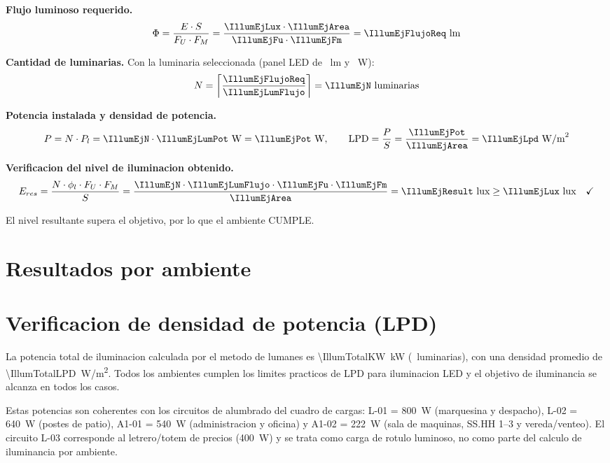 \textbf{Flujo luminoso requerido.}
\[
\Phi = \frac{E \cdot S}{F_U \cdot F_M}
     = \frac{\IllumEjLux \cdot \IllumEjArea}{\IllumEjFu \cdot \IllumEjFm}
     = \IllumEjFlujoReq~\text{lm}
\]

\textbf{Cantidad de luminarias.} Con la luminaria seleccionada (panel LED de
\IllumEjLumFlujo~lm y \IllumEjLumPot~W):
\[
N = \left\lceil \frac{\IllumEjFlujoReq}{\IllumEjLumFlujo} \right\rceil
  = \IllumEjN~\text{luminarias}
\]

\textbf{Potencia instalada y densidad de potencia.}
\[
P = N \cdot P_l = \IllumEjN \cdot \IllumEjLumPot~\text{W} = \IllumEjPot~\text{W},
\qquad
\text{LPD} = \frac{P}{S} = \frac{\IllumEjPot}{\IllumEjArea} = \IllumEjLpd~\text{W/m}^2
\]

\textbf{Verificacion del nivel de iluminacion obtenido.}
\[
E_{res} = \frac{N \cdot \phi_l \cdot F_U \cdot F_M}{S}
        = \frac{\IllumEjN \cdot \IllumEjLumFlujo \cdot \IllumEjFu \cdot \IllumEjFm}{\IllumEjArea}
        = \IllumEjResult~\text{lux} \geq \IllumEjLux~\text{lux}
        \quad \checkmark
\]

El nivel resultante supera el objetivo, por lo que el ambiente CUMPLE.

\section{Resultados por ambiente}
\IllumNotaN

\ILLUMTAB

\section{Verificacion de densidad de potencia (LPD)}
La potencia total de iluminacion calculada por el metodo de lumanes es
\SI{\IllumTotalKW}{kW} (\IllumTotalN~luminarias), con una densidad promedio de
\SI{\IllumTotalLPD}{W/m^2}. Todos los ambientes cumplen los limites practicos
de LPD para iluminacion LED y el objetivo de iluminancia se alcanza en todos
los casos.

Estas potencias son coherentes con los circuitos de alumbrado del cuadro de
cargas: L-01 = 800~W (marquesina y despacho), L-02 = 640~W (postes de patio),
A1-01 = 540~W (administracion y oficina) y A1-02 = 222~W (sala de maquinas,
SS.HH 1--3 y vereda/venteo). El circuito L-03 corresponde al letrero/totem de
precios (400~W) y se trata como carga de rotulo luminoso, no como parte del
calculo de iluminancia por ambiente.

